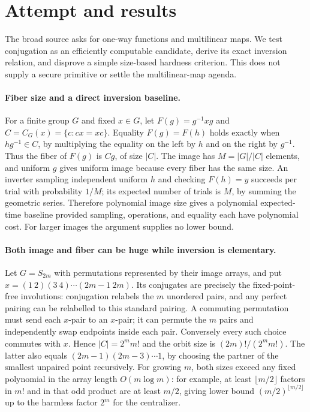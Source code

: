 \documentclass[11pt]{article}
\begin{document}
\section{Attempt and results}
The broad source asks for one-way functions and multilinear maps. We test
conjugation as an efficiently computable candidate, derive its exact inversion
relation, and disprove a simple size-based hardness criterion. This does not
supply a secure primitive or settle the multilinear-map agenda.

\paragraph{Fiber size and a direct inversion baseline.}
For a finite group $G$ and fixed $x\in G$, let $F(g)=g^{-1}xg$ and
$C=C_G(x)=\{c:cx=xc\}$. Equality $F(g)=F(h)$ holds exactly when
$hg^{-1}\in C$, by multiplying the equality on the left by $h$ and on the
right by $g^{-1}$. Thus the fiber of $F(g)$ is $Cg$, of size $|C|$.
The image has $M=|G|/|C|$ elements, and uniform $g$ gives uniform image
because every fiber has the same size. An inverter sampling independent
uniform $h$ and checking $F(h)=y$ succeeds per trial with probability $1/M$;
its expected number of trials is $M$, by summing the geometric series.
Therefore polynomial image size gives a polynomial expected-time baseline
provided sampling, operations, and equality each have polynomial cost.
For larger images the argument supplies no lower bound.

\paragraph{Both image and fiber can be huge while inversion is elementary.}
Let $G=S_{2m}$ with permutations represented by their image arrays, and put
$x=(1\ 2)(3\ 4)\cdots(2m-1\ 2m)$.
Its conjugates are precisely the fixed-point-free involutions: conjugation
relabels the $m$ unordered pairs, and any perfect pairing can be relabelled
to this standard pairing. A commuting permutation must send each $x$-pair
to an $x$-pair; it can permute the $m$ pairs and independently swap endpoints
inside each pair. Conversely every such choice commutes with $x$.
Hence $|C|=2^m m!$ and the orbit size is $(2m)!/(2^m m!)$.
The latter also equals $(2m-1)(2m-3)\cdots1$, by choosing the partner of
the smallest unpaired point recursively. For growing $m$, both sizes exceed
any fixed polynomial in the array length $O(m\log m)$: for example, at least
$\lfloor m/2\rfloor$ factors in $m!$ and in that odd product are at least
$m/2$, giving lower bound $(m/2)^{\lfloor m/2\rfloor}$ up to the harmless
factor $2^m$ for the centralizer.
\end{document}
